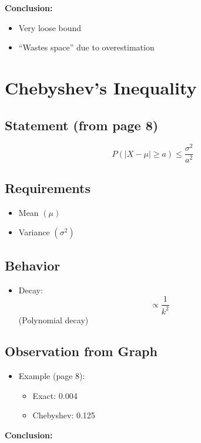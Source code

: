 \documentclass[11pt]{article}
\begin{document}
\textbf{Conclusion:}

\begin{itemize}
\item Very loose bound
\item ``Wastes space'' due to overestimation
\end{itemize}

\section{Chebyshev's Inequality}

\subsection{Statement (from page 8)}

\[
P(|X - \mu| \ge a) \le \frac{\sigma^2}{a^2}
\]

\subsection{Requirements}

\begin{itemize}
\item Mean $(\mu)$
\item Variance $(\sigma^2)$
\end{itemize}

\subsection{Behavior}

\begin{itemize}
\item Decay:
\[
\propto \frac{1}{k^2}
\]
(Polynomial decay)
\end{itemize}

\subsection{Observation from Graph}

\begin{itemize}
\item Example (page 8):
\begin{itemize}
\item Exact: 0.004
\item Chebyshev: 0.125
\end{itemize}
\end{itemize}

\textbf{Conclusion:}
\end{document}
